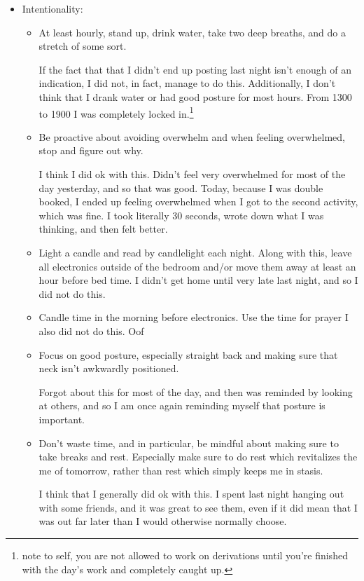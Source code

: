 \documentclass[12pt]{article}[titlepage]
\renewcommand{\,}{\textsuperscript{,}}
\begin{document}
\begin{itemize}   
\item Intentionality:  
\begin{itemize}  
\item At least hourly, stand up, drink water, take two deep breaths, and do a stretch of some sort.

If the fact that that I didn't end up posting last night isn't enough of an indication, I did not, in fact, manage to do this.  
Additionally, I don't think that I drank water or had good posture for most hours.  
From 1300 to 1900 I was completely locked in.\footnote{note to self, you are not allowed to work on derivations until you're finished with the day's work and completely caught up.}  
\item Be proactive about avoiding overwhelm and when feeling overwhelmed, stop and figure out why.

I think I did ok with this. Didn't feel very overwhelmed for most of the day yesterday, and so that was good.  
Today, because I was double booked, I ended up feeling overwhelmed when I got to the second activity, which was fine.  
I took literally 30 seconds, wrote down what I was thinking, and then felt better.  
\item Light a candle and read by candlelight each night. Along with this, leave all electronics outside of the bedroom and/or move them away at least an hour before bed time.  
I didn't get home until very late last night, and so I did not do this.  
\item Candle time in the morning before electronics. Use the time for prayer  
I also did not do this. Oof  
\item Focus on good posture, especially straight back and making sure that neck isn't awkwardly positioned.

Forgot about this for most of the day, and then was reminded by looking at others, and so I am once again reminding myself that posture is important.

\item Don't waste time, and in particular, be mindful about making sure to take breaks and rest. Especially make sure to do rest which revitalizes the me of tomorrow, rather than rest which simply keeps me in stasis.

I think that I generally did ok with this.  
I spent last night hanging out with some friends, and it was great to see them, even if it did mean that I was out far later than I would otherwise normally choose.


\end{itemize}
\end{itemize}
\end{document}

